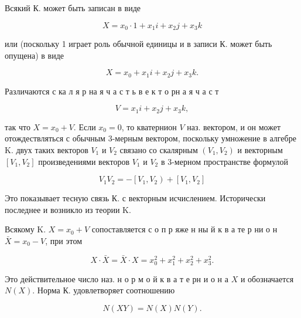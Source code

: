 \documentclass[10pt]{article}
\begin{document}
Всякий К. может быть записан в виде



\[

X=x_{0} \cdot 1+x_{1} i+x_{2} j+x_{3} k

\]



или (поскольку 1 играет роль обычной единицы и в записи К. может быть опущена) в виде



\[

X=x_{0}+x_{1} i+x_{2} j+x_{3} k .

\]



Различаются с ка л я р на я ч а с т ь в е к т о рн а я ч а с т



\[

V=x_{1} i+x_{2} j+x_{3} k,

\]



так что $X=x_{0}+V$. Если $x_{0}=0$, то кватернион $V$ наз. вектором, и он может отождествляться с обычным 3-мерным вектором, поскольку умножение в алгебре $\mathrm{K}$. двух таких векторов $V_{1}$ и $V_{2}$ связано со скалярным $\left(V_{1}, V_{2}\right)$ и векторным $\left[V_{1}, V_{2}\right]$ произведениями векторов $V_{1}$ и $V_{2}$ в 3-мерном пространстве формулой



\[

V_{1} V_{2}=-\left[V_{1}, V_{2}\right)+\left[V_{1}, V_{2}\right]

\]



Это показывает тесную связь К. с векторным исчислением. Исторически последнее и возникло из теории $\mathrm{K}$.



Всякому K. $X=x_{0}+V$ сопоставляется с о п р яже н ны й к в а те р ни о н $\bar{X}=x_{0}-V$, при этом



\[

X \cdot \bar{X}=\bar{X} \cdot X=x_{0}^{2}+x_{1}^{2}+x_{2}^{2}+x_{3}^{2} .

\]



Это действительное число наз. н о р м о й к в а т е рн и о н а $X$ и обозначается $N(X)$. Норма К. удовлетворяет соотношению



\[

N(X Y)=N(X) N(Y) .

\]
\end{document}
